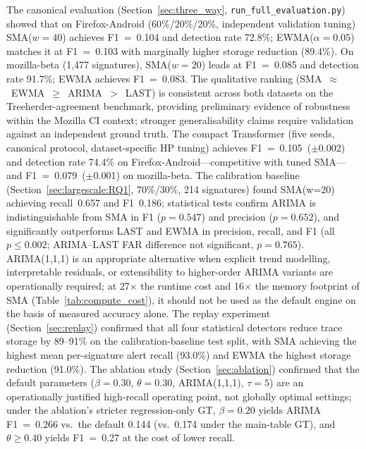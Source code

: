 \documentclass[pdflatex,sn-nature]{sn-jnl}
\theoremstyle{thmstyleone}%
\begin{document}
The canonical evaluation (Section~\ref{sec:three_way},
\texttt{run\_full\_evaluation.py}) showed that on Firefox-Android
(60\%/20\%/20\%, independent validation tuning) SMA($w=40$) achieves F1~=~0.104
and detection rate 72.8\%; EWMA($\alpha=0.05$) matches it at F1~=~0.103 with
marginally higher storage reduction (89.4\%).
On mozilla-beta (1{,}477 signatures), SMA($w=20$) leads at F1~=~0.085 and
detection rate 91.7\%; EWMA achieves F1~=~0.083.
The qualitative ranking (SMA~$\approx$~EWMA~$\geq$~ARIMA~$>$~LAST) is
consistent across both datasets on the Treeherder-agreement benchmark,
providing preliminary evidence of robustness within the Mozilla CI context;
stronger generalisability claims require validation against an independent
ground truth.
The compact Transformer (five seeds, canonical protocol,
dataset-specific HP tuning) achieves F1~=~0.105~($\pm$0.002) and
detection rate 74.4\% on Firefox-Android---competitive with tuned
SMA---and F1~=~0.079~($\pm$0.001) on mozilla-beta.
The calibration baseline (Section~\ref{sec:largescale:RQ1}, 70\%/30\%,
214 signatures) found SMA(w=20) achieving recall~0.657 and F1~0.186;
statistical tests confirm ARIMA is indistinguishable from SMA in F1
($p=0.547$) and precision ($p=0.652$), and significantly outperforms
LAST and EWMA in precision, recall, and F1 (all $p\leq 0.002$;
ARIMA--LAST FAR difference not significant, $p=0.765$).
ARIMA(1,1,1) is an appropriate alternative when explicit trend modelling,
interpretable residuals, or extensibility to higher-order ARIMA variants
are operationally required; at 27$\times$ the runtime cost and 16$\times$
the memory footprint of SMA (Table~\ref{tab:compute_cost}), it should not
be used as the default engine on the basis of measured accuracy alone.
The replay experiment (Section~\ref{sec:replay}) confirmed that all four
statistical detectors reduce trace storage by 89--91\% on the
calibration-baseline test split, with SMA achieving the highest mean
per-signature alert recall (93.0\%) and EWMA the highest storage reduction
(91.0\%).
The ablation study (Section~\ref{sec:ablation}) confirmed that the default
parameters ($\beta = 0.30$, $\theta = 0.30$, ARIMA(1,1,1), $\tau = 5$)
are an operationally justified high-recall operating point, not globally
optimal settings; under the ablation's stricter regression-only GT,
$\beta=0.20$ yields ARIMA F1~=~0.266 vs.\ the default 0.144 (vs.\ 0.174
under the main-table GT), and $\theta\geq0.40$ yields F1~=~0.27 at the
cost of lower recall.
\end{document}

